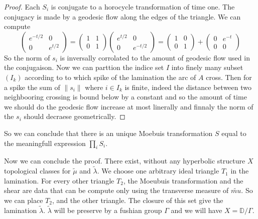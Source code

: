 \begin{proof}
Each $S_i$ is conjugate to a horocycle transformation of time one. The conjugacy is made by a geodesic flow along the edges of the triangle. We can compute \[
\begin{pmatrix} e^{-t/2} & 0 \\ 0 & e^{t/2} \end{pmatrix} = \begin{pmatrix} 1 & 1 \\ 0 & 1 \end{pmatrix} \begin{pmatrix} e^{t/2} & 0 \\ 0 & e^{-t/2} \end{pmatrix} = \begin{pmatrix} 1 & 0 \\ 0 & 1 \end{pmatrix}+ \begin{pmatrix} 0 & e^{-t} \\ 0 & 0 \end{pmatrix}
\]
So the norm of $s_i$ is inversally corrolated to the amount of geodesic flow used in the conjugaison.
Now we can parttion the indice set $I$ into finely many subset $(I_k)$ according to to which spike of the lamination the arc of $A$ cross.
Then for a spike the sum of $\|s_i \|$ where $i \in I_k$ is finite, indeed the distance between two neighbooring crossing is bound below by a constant and so the amount of time we should do the geodesic flow increase at most linerally and finnaly the norm of the $s_i$ should decraese geometrically.
\end{proof}

So we can conclude that there is an unique Moebuis transformation $S$ equal to the meaningfull expression $\prod_i S_i$.

Now we can conclude the proof. There exist, without any hyperbolic structure $X$  topological classes for $\tilde{\mu}$ and $\tilde{\lambda}$. We choose one arbitrary ideal triangle $T_1$ in the lamination. For every other triangle $T_2$, the Moeubuis transformation and the shear are data that can be compute only using the transverse measure of $\tilde{mu}$. So we can place $T_2$, and the other triangle. The closure of this set give the lamination $\tilde{\lambda}$. $\tilde{\lambda}$ will be preserve by a fushian group $\Gamma$ and we will have $X=\mathbb{D}  / \Gamma$.
